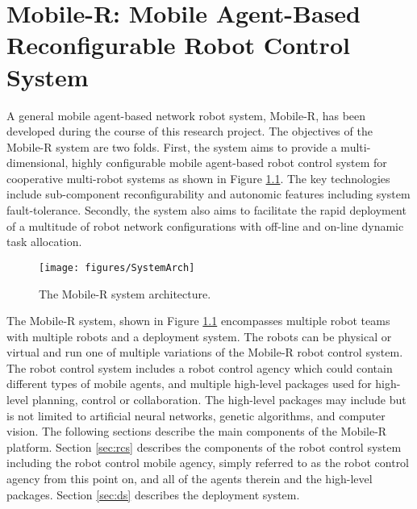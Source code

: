 \chapter{Mobile-R: Mobile Agent-Based Reconfigurable Robot Control System}
  
  A general mobile agent-based network robot system, Mobile-R, has been
    developed during the course of this research project.
  The objectives of the Mobile-R system are two folds.
  First, the system aims to provide a multi-dimensional, highly configurable 
    mobile agent-based robot control system for cooperative multi-robot systems
    as shown in Figure \ref{fig:systemarch}.
  The key technologies include sub-component reconfigurability and 
    autonomic features including system fault-tolerance.
  Secondly, the system also aims to facilitate the rapid deployment of a 
    multitude of robot network configurations with off-line and on-line dynamic 
    task allocation.
  \begin{figure}%
    \centerline{\texttt{[image: figures/SystemArch]}}
    \caption{The Mobile-R system architecture.}
    \label{fig:systemarch}
  \end{figure}
    
  The Mobile-R system, shown in Figure \ref{fig:systemarch} encompasses 
    multiple robot teams with multiple robots and a deployment system.
  The robots can be physical or virtual and run one of multiple variations
    of the Mobile-R robot control system.
  The robot control system includes a robot control agency which could
    contain different types of mobile agents, and multiple high-level packages 
    used for high-level planning, control or collaboration.
  The high-level packages may include but is not limited to artificial neural 
    networks, genetic algorithms, and computer vision.
  The following sections describe the main components of the Mobile-R
    platform.
  Section \ref{sec:rcs} describes the components of the robot
    control system including the robot control mobile agency, simply referred
    to as the robot control agency from this point on, and all of the agents 
    therein and the high-level packages.
  Section \ref{sec:ds} describes the deployment system.

